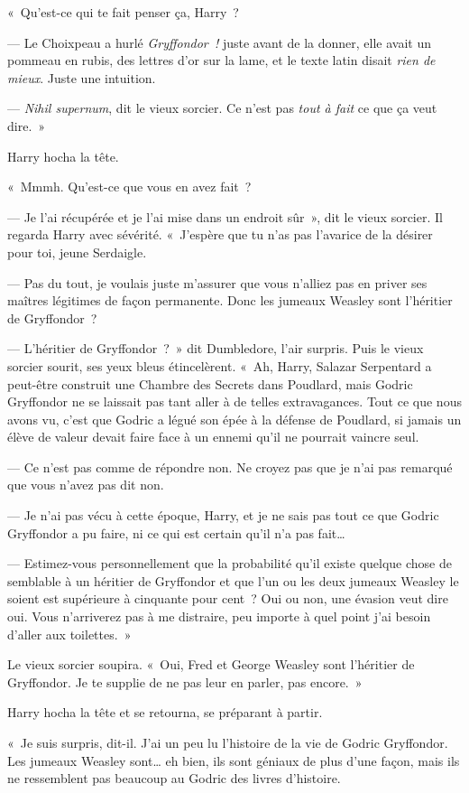«~Qu'est-ce qui te fait penser ça, Harry~?

--- Le Choixpeau a hurlé \emph{Gryffondor~!} juste avant de la donner, elle avait un pommeau en rubis, des lettres d'or sur la lame, et le texte latin disait \emph{rien de mieux}.
Juste une intuition.

--- \emph{Nihil supernum}, dit le vieux sorcier.
Ce n'est pas \emph{tout à fait} ce que ça veut dire.~»

Harry hocha la tête.

«~Mmmh. Qu'est-ce que vous en avez fait~?

--- Je l'ai récupérée et je l'ai mise dans un endroit sûr~», dit le vieux sorcier.
Il regarda Harry avec sévérité.
«~J'espère que tu n'as pas l'avarice de la désirer pour toi, jeune Serdaigle.

--- Pas du tout, je voulais juste m'assurer que vous n'alliez pas en priver ses maîtres légitimes de façon permanente.
Donc les jumeaux Weasley sont l'héritier de Gryffondor~?

--- L'héritier de Gryffondor~?~»
dit Dumbledore, l'air surpris.
Puis le vieux sorcier sourit, ses yeux bleus étincelèrent.
«~Ah, Harry, Salazar Serpentard a peut-être construit une Chambre des Secrets dans Poudlard, mais Godric Gryffondor ne se laissait pas tant aller à de telles extravagances.
Tout ce que nous avons vu, c'est que Godric a légué son épée à la défense de Poudlard, si jamais un élève de valeur devait faire face à un ennemi qu'il ne pourrait vaincre seul.

--- Ce n'est pas comme de répondre non.
Ne croyez pas que je n'ai pas remarqué que vous n'avez pas dit non.

--- Je n'ai pas vécu à cette époque, Harry, et je ne sais pas tout ce que Godric Gryffondor a pu faire, ni ce qui est certain qu'il n'a pas fait…

--- Estimez-vous personnellement que la probabilité qu'il existe quelque chose de semblable à un héritier de Gryffondor et que l'un ou les deux jumeaux Weasley le soient est supérieure à cinquante pour cent~?
Oui ou non, une évasion veut dire oui.
Vous n'arriverez pas à me distraire, peu importe à quel point j'ai besoin d'aller aux toilettes.~»

Le vieux sorcier soupira.
«~Oui, Fred et George Weasley sont l'héritier de Gryffondor.
Je te supplie de ne pas leur en parler, pas encore.~»

Harry hocha la tête et se retourna, se préparant à partir.

«~Je suis surpris, dit-il.
J'ai un peu lu l'histoire de la vie de Godric Gryffondor.
Les jumeaux Weasley sont… eh bien, ils sont géniaux de plus d'une façon, mais ils ne ressemblent pas beaucoup au Godric des livres d'histoire.

